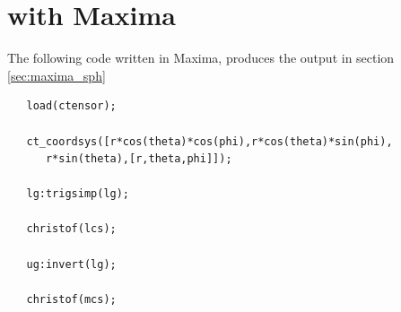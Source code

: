 \lstset{frame=single, basicstyle=\tiny}



\section{ with Maxima}
\label{sec:maxima}

The following code written in Maxima, produces the output in section \ref{sec:maxima_sph}

\begin{lstlisting}
   load(ctensor);

   ct_coordsys([r*cos(theta)*cos(phi),r*cos(theta)*sin(phi),
      r*sin(theta),[r,theta,phi]]);

   lg:trigsimp(lg);

   christof(lcs);

   ug:invert(lg);

   christof(mcs);
\end{lstlisting}

